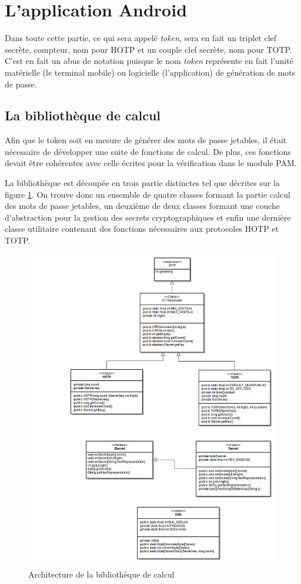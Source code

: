 \section{L'application Android}
Dans toute cette partie, ce qui sera appelé \emph{token}, sera en fait un triplet clef secrète, 
compteur, nom pour HOTP et un couple clef secrète, nom pour TOTP. C'est en fait un abus de notation
puisque le nom \emph{token} représente en fait l'unité matérielle (le terminal mobile) ou logicielle
(l'application) de génération de mots de passe.

\subsection{La bibliothèque de calcul}
Afin que le token soit en mesure de générer des mots de passe jetables, il était
nécessaire de développer une suite de fonctions de calcul. De plus, ces fonctions devait
être cohérentes avec celle écrites pour la vérification dans le module PAM.

La bibliothèque est découpée en trois partie distinctes tel que décrites sur la figure
\ref{fig:umlLib}. On trouve donc un ensemble de quatre classes formant la partie calcul
des mots de passe jetables, un deuxième de deux classes formant une couche d'abstraction
pour la gestion des secrets cryptographiques et enfin une dernière classe utilitaire 
contenant des fonctions nécessaires aux protocoles HOTP et TOTP.

\begin{figure}
  \centering
  \includegraphics[scale=0.4]{../graphics/uml_lib.jpg}
  \caption{Architecture de la bibliothèque de calcul}
  \label{fig:umlLib}
\end{figure}

